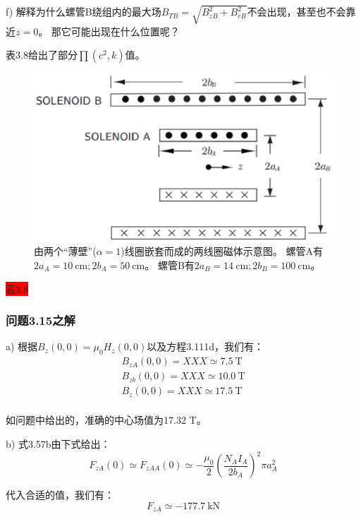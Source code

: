 f) 解释为什么螺管B绕组内的最大场$B_{TB}=\sqrt{B_{zB}^2 + B_{rB}^2}$不会出现，甚至也不会靠近$z=0$。
那它可能出现在什么位置呢？

表3.8给出了部分$\prod(c^2,k)$值。

\begin{figure}[htbp]
	\centering
	\includegraphics[scale=0.5]{chpt3/figs/fig3.44.eps}
	\caption{由两个“薄壁”($\alpha = 1$)线圈嵌套而成的两线圈磁体示意图。
		螺管A有$2a_A=10\ \mathrm{cm};2b_A = 50\ \mathrm{cm}$。
		螺管B有$2a_B = 14\ \mathrm{cm}; 2b_B = 100\ \mathrm{cm}$。}
\end{figure}
\colorbox{red}{表3.8}


\subsubsection{问题3.15之解}
a) 根据$B_z(0,0)=\mu_0H_z(0, 0)$以及方程3.111d，我们有：
\begin{eqnarray*}
B_{zA}(0,0)=XXX\simeq 7.5\ \mathrm{T}\\
B_{zb}(0,0)=XXX\simeq 10.0\ \mathrm{T}\\
B_{z}(0,0)=XXX\simeq 17.5\ \mathrm{T}\\
\end{eqnarray*}

如问题中给出的，准确的中心场值为17.32 T。

b) 式3.57b由下式给出：
\begin{equation*}
F_{zA}(0)\simeq F_{zAA}(0)\simeq-\frac{\mu_{0}}{2}(\frac{N_{A}I_{A}}{2b_{A}})^{2}\pi a_{A}^{2}\tag{3.57b}%
\end{equation*}

代入合适的值，我们有：
\begin{equation*}
F_{zA}\simeq -177.7\ \mathrm{kN}
\end{equation*}

